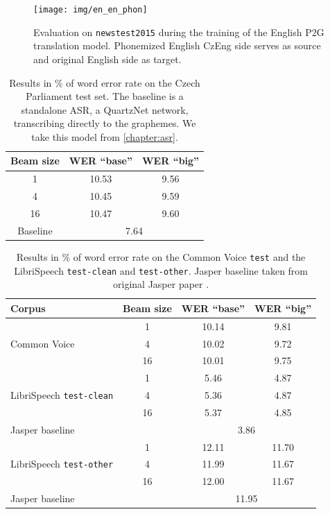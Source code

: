 \begin{figure}[h]
	\texttt{[image: img/en\_en\_phon]}
	\caption{Evaluation on \texttt{newstest2015} during the training of the English P2G translation model. Phonemized English CzEng side serves as source and original English side as target.}
	\label{fig:en_en_phon}
\end{figure}




\begin{table}[h]
	\centering
	\begin{tabular}{c|cc}
		\bf Beam size & \bf WER ``base''& \bf WER ``big'' \\
		\hline
		1    &    10.53 & 9.56    \\
		4    &    10.45& 9.59    \\
		16    &    10.47& 9.60\\
		Baseline & \multicolumn{2}{c}{7.64} 
		
	\end{tabular}
	
	\caption{Results in \% of word error rate on the Czech Parliament test set. The baseline is a standalone ASR, a QuartzNet network, transcribing directly to the graphemes. We take this model from \cref{chapter:asr}.}
	\label{tab:phon_cs}
\end{table}


\begin{table}[H]
	\centering
	\begin{tabular}{lc|cc}
		\bf Corpus & \bf Beam size & \bf WER ``base''& \bf WER ``big'' \\
		\hline
		\multirow{3}{*}{Common Voice}    & 1    &10.14    &    9.81    \\
		& 4    & 10.02    &    9.72    \\
		& 16    &10.01    & 9.75    \\
		\hline
		
		\multirow{3}{*}{LibriSpeech \texttt{test-clean}}    & 1    &    5.46 &    4.87    \\
		& 4    &  5.36 &    4.87    \\
		& 16     &5.37    & 4.85    \\
		\multicolumn{2}{l|}{Jasper baseline} & \multicolumn{2}{c}{3.86} \\
		\hline
		
		\multirow{3}{*}{LibriSpeech \texttt{test-other}}    & 1    &    12.11 &11.70    \\
		& 4    &11.99     &    11.67    \\
		& 16    & 12.00     & 11.67    \\
		\multicolumn{2}{l|}{Jasper baseline} & \multicolumn{2}{c}{11.95} \\
		
	\end{tabular}
	
	\caption{Results in \% of word error rate on the Common Voice \texttt{test} and the LibriSpeech \texttt{test-clean} and \texttt{test-other}. Jasper baseline taken from original Jasper paper .}
	\label{tab:phon_en}
\end{table}


